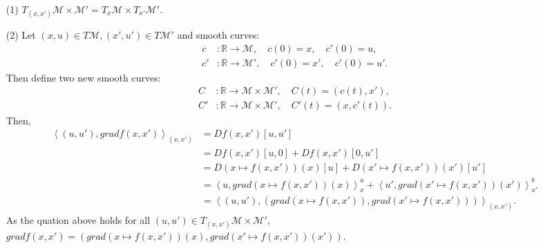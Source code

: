 \documentclass[en, oneside]{assignment}
\begin{document}
\begin{sol}
    \begin{itemize}
        \item[(1)] $T_{(x, x')}\mathcal{M} \times \mathcal{M}' = T_x \mathcal{M} \times T_{x'} \mathcal{M}'$.
        \item[(2)] Let $(x, u) \in T\mathcal{M}, (x', u') \in T\mathcal{M}'$ and smooth curves:
        \begin{align*}
            c & : \mathbb{R} \to \mathcal{M}, \quad c(0) = x, \quad c'(0) = u,\\
            c'& : \mathbb{R} \to \mathcal{M}', \quad c'(0) = x', \quad c'(0) = u'. 
        \end{align*}
        Then define two new smooth curves:
        \begin{align*}
            C & : \mathbb{R} \to \mathcal{M} \times \mathcal{M}', \quad C(t) = (c(t), x'),\\
            C'& : \mathbb{R} \to \mathcal{M} \times \mathcal{M}', \quad C'(t) = (x, c'(t)).
        \end{align*}
        Then,
        \begin{align*}
            \left\langle (u, u'), gradf(x, x') \right\rangle _{(x, x')} & = Df(x, x')[u, u']\\
            & = Df(x, x')[u, 0] + Df(x, x')[0, u']\\
            & = D(x \mapsto f(x, x'))(x)[u] + D(x' \mapsto f(x, x'))(x')[u']\\
            & = \left\langle u, grad(x \mapsto f(x, x'))(x) \right\rangle^a_x + \left\langle u', grad(x' \mapsto f(x, x'))(x') \right\rangle^b_{x'}\\
            & = \left\langle (u, u'), (grad(x \mapsto f(x, x')), grad(x' \mapsto f(x, x'))) \right\rangle _{(x, x')}.
        \end{align*}
        As the quation above holds for all $(u, u') \in T_{(x, x')}\mathcal{M} \times \mathcal{M}'$, 
        $gradf(x, x') = (grad(x \mapsto f(x, x'))(x), grad(x' \mapsto f(x, x'))(x'))$.
    \end{itemize}
\end{sol}
\end{document}

